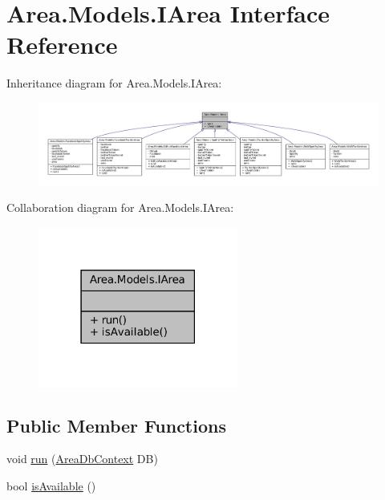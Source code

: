 \hypertarget{interfaceArea_1_1Models_1_1IArea}{}\section{Area.\+Models.\+I\+Area Interface Reference}
\label{interfaceArea_1_1Models_1_1IArea}


Inheritance diagram for Area.\+Models.\+I\+Area\+:
\nopagebreak
\begin{figure}[H]
\begin{center}
\leavevmode
\includegraphics[width=350pt]{interfaceArea_1_1Models_1_1IArea__inherit__graph}
\end{center}
\end{figure}


Collaboration diagram for Area.\+Models.\+I\+Area\+:
\nopagebreak
\begin{figure}[H]
\begin{center}
\leavevmode
\includegraphics[width=186pt]{interfaceArea_1_1Models_1_1IArea__coll__graph}
\end{center}
\end{figure}
\subsection*{Public Member Functions}
\begin{DoxyCompactItemize}
\item 
void \mbox{\hyperlink{interfaceArea_1_1Models_1_1IArea_af153822d2715dad8eb1c250bcc4de567}{run}} (\mbox{\hyperlink{classArea_1_1DAT_1_1AreaDbContext}{Area\+Db\+Context}} DB)
\item 
bool \mbox{\hyperlink{interfaceArea_1_1Models_1_1IArea_a742b324f0d7573f7f99f9e2adb5df94c}{is\+Available}} ()
\end{DoxyCompactItemize}


